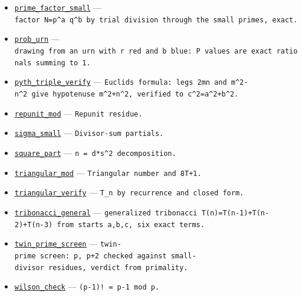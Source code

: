 \documentclass[
  10pt,
]{article}
\begin{document}
\begin{itemize}
\item
  \href{../generation_1/I3/algos_i3.py}{\texttt{prime\_factor\_small}}
  ---
  \texttt{factor\ N=p\^{}a\ q\^{}b\ by\ trial\ division\ through\ the\ small\ primes,\ exact.}
\item
  \href{../generation_1/I3/algos_i3.py}{\texttt{prob\_urn}} ---
  \texttt{drawing\ from\ an\ urn\ with\ r\ red\ and\ b\ blue:\ P\ values\ are\ exact\ rationals\ summing\ to\ 1.}
\item
  \href{../generation_1/I3/algos_i3.py}{\texttt{pyth\_triple\_verify}}
  ---
  \texttt{Euclid\textquotesingle{}s\ formula:\ legs\ 2mn\ and\ m\^{}2-n\^{}2\ give\ hypotenuse\ m\^{}2+n\^{}2,\ verified\ to\ c\^{}2=a\^{}2+b\^{}2.}
\item
  \href{../generation_1/I1/algos_gen1_big.py}{\texttt{repunit\_mod}} ---
  \texttt{Repunit\ residue.}
\item
  \href{../generation_1/I1/algos_gen1_big.py}{\texttt{sigma\_small}} ---
  \texttt{Divisor-sum\ partials.}
\item
  \href{../generation_1/I1/algos_gen1_big.py}{\texttt{square\_part}} ---
  \texttt{n\ =\ d*s\^{}2\ decomposition.}
\item
  \href{../generation_1/I1/algos_gen1_big.py}{\texttt{triangular\_mod}}
  --- \texttt{Triangular\ number\ and\ 8T+1.}
\item
  \href{../generation_1/I1/algos_gen1_big.py}{\texttt{triangular\_verify}}
  --- \texttt{T\_n\ by\ recurrence\ and\ closed\ form.}
\item
  \href{../generation_1/I3/algos_i3.py}{\texttt{tribonacci\_general}}
  ---
  \texttt{generalized\ tribonacci\ T(n)=T(n-1)+T(n-2)+T(n-3)\ from\ starts\ a,b,c,\ six\ exact\ terms.}
\item
  \href{../generation_1/I3/algos_i3.py}{\texttt{twin\_prime\_screen}}
  ---
  \texttt{twin-prime\ screen:\ p,\ p+2\ checked\ against\ small-divisor\ residues,\ verdict\ from\ primality.}
\item
  \href{../generation_1/I1/algos_gen1_big.py}{\texttt{wilson\_check}}
  --- \texttt{(p-1)!\ =\ p-1\ mod\ p.}
\end{itemize}
\end{document}
